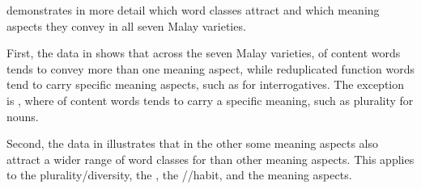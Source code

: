 { demonstrates in more detail which word classes attract  and which meaning aspects they convey in all seven Malay varieties.



First, the data in  shows that across the seven Malay varieties,  of content words tends to convey more than one meaning aspect, while reduplicated function words tend to carry specific meaning aspects, such as  for interrogatives. The exception is , where  of content words tends to carry a specific meaning, such as plurality for nouns.



Second, the data in  illustrates that in the other  some meaning aspects also attract a wider range of word classes for  than other meaning aspects. This applies to the plurality/diversity, the , the //habit, and the  meaning aspects.


\begin{table}[b]


\end{table}}
